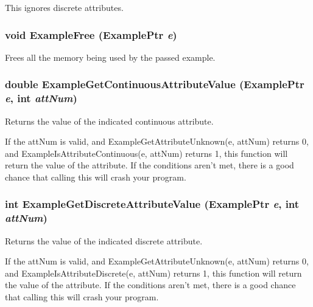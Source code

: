 This ignores discrete attributes. 
\subsubsection{\setlength{\rightskip}{0pt plus 5cm}void Example\-Free ({\bf Example\-Ptr} {\em e})}\label{Example_8h_a10}


Frees all the memory being used by the passed example. 

\subsubsection{\setlength{\rightskip}{0pt plus 5cm}double Example\-Get\-Continuous\-Attribute\-Value ({\bf Example\-Ptr} {\em e}, int {\em att\-Num})}\label{Example_8h_a23}


Returns the value of the indicated continuous attribute. 

If the att\-Num is valid, and Example\-Get\-Attribute\-Unknown(e, att\-Num) returns 0, and Example\-Is\-Attribute\-Continuous(e, att\-Num) returns 1, this function will return the value of the attribute. If the conditions aren't met, there is a good chance that calling this will crash your program. 
\subsubsection{\setlength{\rightskip}{0pt plus 5cm}int Example\-Get\-Discrete\-Attribute\-Value ({\bf Example\-Ptr} {\em e}, int {\em att\-Num})}\label{Example_8h_a22}


Returns the value of the indicated discrete attribute. 

If the att\-Num is valid, and Example\-Get\-Attribute\-Unknown(e, att\-Num) returns 0, and Example\-Is\-Attribute\-Discrete(e, att\-Num) returns 1, this function will return the value of the attribute. If the conditions aren't met, there is a good chance that calling this will crash your program. 
